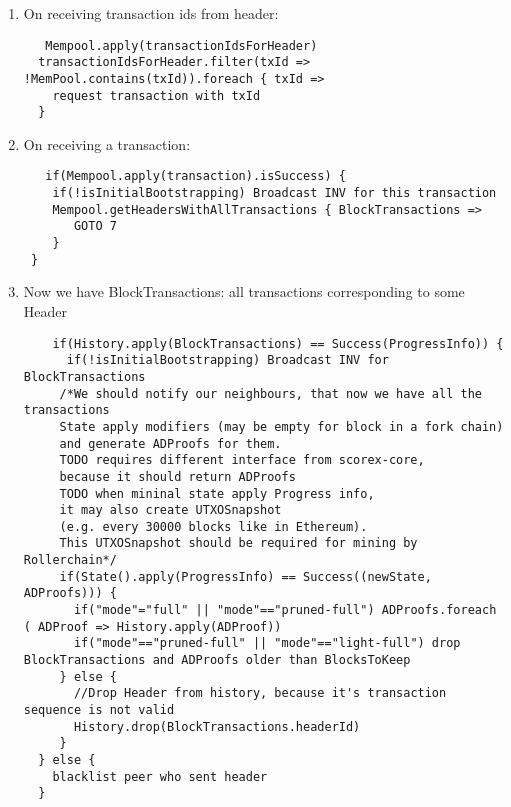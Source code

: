 \documentclass[]{report}   %
\begin{document}
\begin{enumerate}
   \item On receiving transaction ids from header:
   \begin{verbatim}
   Mempool.apply(transactionIdsForHeader)
  transactionIdsForHeader.filter(txId => !MemPool.contains(txId)).foreach { txId => 
    request transaction with txId
  }
   \end{verbatim}
   \item On receiving a transaction:
   \begin{verbatim}
   if(Mempool.apply(transaction).isSuccess) {
    if(!isInitialBootstrapping) Broadcast INV for this transaction
    Mempool.getHeadersWithAllTransactions { BlockTransactions =>
       GOTO 7
    }
 }
   \end{verbatim}
   \item Now we have BlockTransactions: all transactions corresponding to some Header
   \begin{verbatim}
    if(History.apply(BlockTransactions) == Success(ProgressInfo)) {
      if(!isInitialBootstrapping) Broadcast INV for BlockTransactions
     /*We should notify our neighbours, that now we have all the transactions
     State apply modifiers (may be empty for block in a fork chain)
     and generate ADProofs for them.
     TODO requires different interface from scorex-core,
     because it should return ADProofs
     TODO when mininal state apply Progress info,
     it may also create UTXOSnapshot
     (e.g. every 30000 blocks like in Ethereum).
     This UTXOSnapshot should be required for mining by Rollerchain*/
     if(State().apply(ProgressInfo) == Success((newState, ADProofs))) {
       if("mode"="full" || "mode"=="pruned-full") ADProofs.foreach ( ADProof => History.apply(ADProof))
       if("mode"=="pruned-full" || "mode"=="light-full") drop BlockTransactions and ADProofs older than BlocksToKeep
     } else {
       //Drop Header from history, because it's transaction sequence is not valid
       History.drop(BlockTransactions.headerId)
     }
  } else {
    blacklist peer who sent header
  }
   \end{verbatim}
\end{enumerate}
\end{document}
